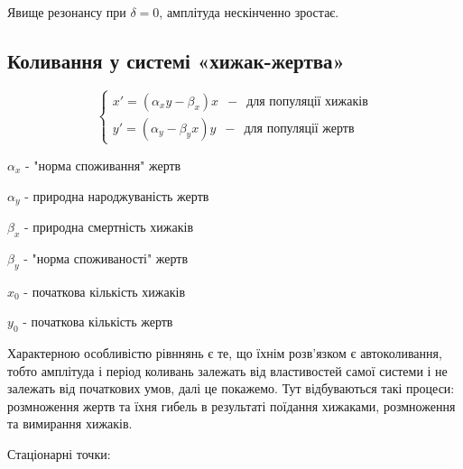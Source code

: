 \documentclass[11pt]{article}
\begin{document}
    \begin{center}
    \end{center}
    { \hspace*{\fill} \\}
    
    Явище резонансу при \(\delta = 0\), амплітуда нескінченно зростає.

    \subsection{Коливання у системі
«хижак-жертва»}\label{ux43aux43eux43bux438ux432ux430ux43dux43dux44f-ux443-ux441ux438ux441ux442ux435ux43cux456-ux445ux438ux436ux430ux43a-ux436ux435ux440ux442ux432ux430}

    \[ \left \{\begin{array}{ll}
            x'=(α_x y - β_x)x \enspace - \enspace \text{для популяції хижаків}\\
            y'=(α_y - β_y x)y \enspace - \enspace \text{для популяції жертв}
           \end{array}
           \right. \]

$ α_x $ - "норма споживання" жертв

$ α_y $ - природна народжуваність жертв

$ β_x $ - природна смертність хижаків

$ β_y $ - "норма споживаності" жертв

$ x_0 $ - початкова кількість хижаків

$ y_0 $ - початкова кількість жертв

Характерною особливістю рівннянь є те, що їхнім розв'язком є
автоколивання, тобто амплітуда і період коливань залежать від
властивостей самої системи і не залежать від початкових умов, далі це
покажемо. Тут відбуваються такі процеси: розмноження жертв та їхня
гибель в результаті поїдання хижаками, розмноження та вимирання хижаків.

    Стаціонарні точки:
\end{document}
